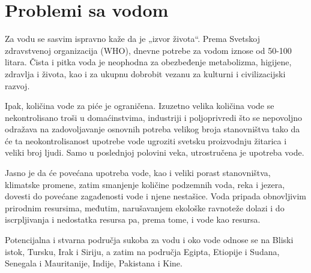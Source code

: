 \documentclass[a4paper]{article}
\begin{document}
\section{Problemi sa vodom}
\label{sec:problemi_sa_vodom}
Za vodu se sasvim ispravno kaže da je „izvor života“. Prema Svetskoj zdravstvenoj organizacija (WHO), dnevne potrebe za vodom iznose od 50-100 litara. Čista i pitka voda je neophodna za obezbeđenje metabolizma, higijene,  zdravlja i života, kao i za ukupnu dobrobit vezanu za kulturni i civilizacijski razvoj.

Ipak, količina vode za piće je ograničena. Izuzetno velika količina vode se nekontrolisano troši u domaćinstvima, industriji i poljoprivredi što se nepovoljno odražava na zadovoljavanje osnovnih potreba velikog broja stanovništva tako da će ta neokontrolisanost upotrebe vode ugroziti svetsku proizvodnju žitarica i veliki broj ljudi. Samo u poslednjoj polovini veka, utrostručena je upotreba vode.

Jasno je da će povećana upotreba vode, kao i veliki porast stanovništva, klimatske promene, zatim smanjenje količine podzemnih voda, reka i jezera, dovesti do povećane zagađenosti vode i njene nestašice. Voda pripada obnovljivim prirodnim resursima, međutim, narušavanjem ekološke ravnoteže dolazi i do iscrpljivanja i nedostatka resursa pa, prema tome, i vode kao resursa.

Potencijalna i stvarna područja sukoba za vodu i oko vode odnose se na Bliski istok, Tursku, Irak i Siriju, a zatim na područja Egipta, Etiopije i Sudana, Senegala i Mauritanije, Indije, Pakistana i Kine.
\end{document}
